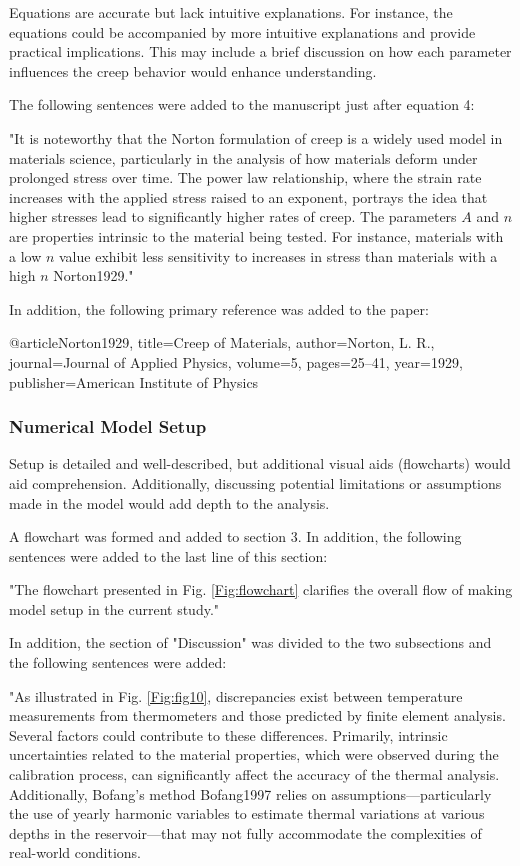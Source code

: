 \documentclass{ar2rc}
\begin{document}
	\RC Equations are accurate but lack intuitive explanations. For instance, the equations could be accompanied by more intuitive explanations and provide practical implications. This may include a brief discussion on how 
	each parameter influences the creep behavior would enhance understanding.
	
	\AR The following sentences were added to the manuscript just after equation 4:
	
	"It is noteworthy that the Norton formulation of creep is a widely used model in materials science, particularly in the analysis of how materials deform under prolonged stress over time. The power law relationship, where the strain rate increases with the applied stress raised to an exponent, portrays the idea that higher stresses lead to significantly higher rates of creep. The parameters $A$ and $n$ are properties intrinsic to the material being tested. For instance, materials with a low $n$ value exhibit less sensitivity to increases in stress than materials with a high $n$ Norton1929."
	
	In addition, the following primary reference was added to the paper:
	
	@article{Norton1929,
		title={Creep of Materials},
		author={Norton, L. R.},
		journal={Journal of Applied Physics},
		volume={5},
		pages={25--41},
		year={1929},
		publisher={American Institute of Physics}}
	
	
	\subsubsection{Numerical Model Setup}
	
	\RC Setup is detailed and well-described, but additional visual aids (flowcharts) would aid comprehension. Additionally, discussing potential limitations or assumptions made in the model would add depth to the analysis.
	
	\AR A flowchart was formed and added to section 3. In addition, the following sentences were added to the last line of this section:
	
	"The flowchart presented in Fig. \ref{Fig:flowchart} clarifies the overall flow of making model setup in the current study."
	
	In addition, the section of "Discussion" was divided to the two subsections and the following sentences were added:
	
	"As illustrated in Fig. \ref{Fig:fig10}, discrepancies exist between temperature measurements from thermometers and those predicted by finite element analysis. Several factors could contribute to these differences. Primarily, intrinsic uncertainties related to the material properties, which were observed during the calibration process, can significantly affect the accuracy of the thermal analysis. Additionally, Bofang's method Bofang1997 relies on assumptions—particularly the use of yearly harmonic variables to estimate thermal variations at various depths in the reservoir—that may not fully accommodate the complexities of real-world conditions.
	
\end{document}
